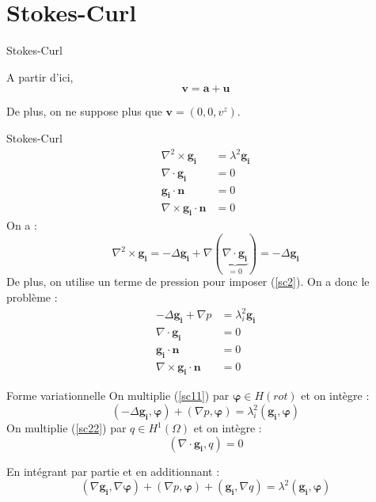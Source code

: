 \documentclass{beamer}
\newcommand{\grad}{{\nabla}}
\newcommand{\laplace}{{\Delta}}
\newcommand{\rot}{{\nabla\times}}
\newcommand{\rott}{{\nabla^2\times}}
\renewcommand{\div}{{\nabla\cdot}}
\begin{document}
\section{Stokes-Curl}
\begin{frame}{Stokes-Curl}
\begin{alertblock}{A partir d'ici,}
\[\bm{v}=\bm{a}+\bm{u}\]
\end{alertblock}

De plus, on ne suppose plus que $\bm{v}=(0,0,v^z)$.
\end{frame}

\begin{frame}{Stokes-Curl}
\begin{align}
\rott \bm{g_i} &= \lambda^2\bm{g_i}\label{sc1}\\
\div \bm{g_i} &= 0\label{sc2}\\
\bm{g_i}\cdot\bm{n}&=0\\
\rot\bm{g_i}\cdot\bm{n}&=0
\end{align}
On a :
\[
\rott\bm{g_i}=-\laplace\bm{g_i}+\grad(\underbrace{\div\bm{g_i}}_{=0})=-\laplace\bm{g_i}
\]
De plus, on utilise un terme de pression pour imposer (\ref{sc2}). On a donc le problème :
\begin{align}
-\laplace \bm{g_i} + \grad p &= \lambda^2_i\bm{g_i}\label{sc11}\\
\div\bm{g_i} &= 0\label{sc22}\\
\bm{g_i}\cdot\bm{n}&=0\\
\rot\bm{g_i}\cdot\bm{n}&=0
\end{align}
\end{frame}

\begin{frame}{Forme variationnelle}
On multiplie (\ref{sc11}) par $\bm{\varphi}\in H(rot)$ et on intègre :
\[
(-\laplace\bm{g_i},\bm{\varphi})+(\grad p,\bm{\varphi}) = \lambda^2_i (\bm{g_i},\bm{\varphi})
\]
On multiplie (\ref{sc22}) par $q\in H^1(\Omega)$ et on intègre :
\[
(\div\bm{g_i},q) = 0
\]
\begin{block}{En intégrant par partie et en additionnant :}
\[
(\grad\bm{g_i},\grad\bm{\varphi}) + (\grad p, \bm{\varphi}) + (\bm{g_i}, \grad q) = \lambda^2(\bm{g_i},\bm{\varphi})
\]
\end{block}
\end{frame}
\end{document}
